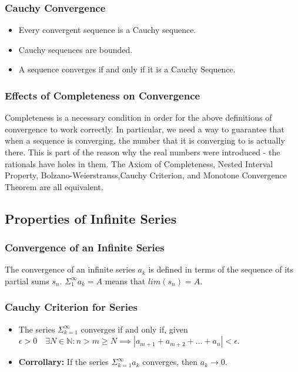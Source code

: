 \documentclass{article}
\begin{document}
\subsubsection{Cauchy Convergence}

\begin{itemize}

\item Every convergent sequence is a Cauchy sequence.

\item Cauchy sequences are bounded.

\item A sequence converges if and only if it is a Cauchy Sequence.

\end{itemize}


\subsubsection{Effects of Completeness on Convergence}
Completeness is a necessary condition in order for the above definitions of convergence to work correctly. In particular, we need a way to guarantee that when a sequence is converging, the number that it is converging to is actually there. This is part of the reason why the real numbers were introduced - the rationals have holes in them. The Axiom of Completeness, Nested Interval Property, Bolzano-Weierstrauss,Cauchy Criterion, and Monotone Convergence Theorem are all equivalent.


\subsection{Properties of Infinite Series}

\subsubsection{Convergence of an Infinite Series}
The convergence of an infinite series \( a_{k} \) is defined in terms of the sequence of its partial sums \( s_{n} \). \( \Sigma_{1}^{\infty} a_{k} = A \) means that \( lim(s_{n}) = A  \).


\subsubsection{Cauchy Criterion for Series}

\begin{itemize}

\item The series \(  \Sigma_{k=1}^{\infty} \) converges if and only if, given \( \epsilon > 0 \quad \exists N \in \mathbb{N} : n>m \geq N \implies \left | a_{m+1}+ a_{m+2} + \ldots + a_{n}     \right | < \epsilon \).

\item \textbf{Corrollary:} If the series \( \Sigma_{k=1}^{\infty} a_{k}  \) converges, then \( a_{k} \rightarrow 0 \).

\end{itemize}
\end{document}
